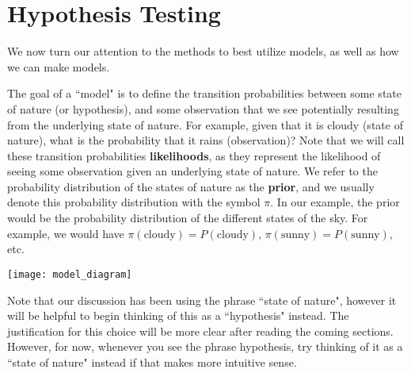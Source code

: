 \section{Hypothesis Testing}

We now turn our attention to the methods to best utilize models, as well as how we can make models. \newline 
\begin{center}
\end{center}


\begin{center}
\end{center}


\begin{center}
\end{center}

The goal of a ``model" is to define the transition probabilities between some state of nature (or hypothesis), and some observation that we see potentially resulting from the underlying state of nature. For example, given that it is cloudy (state of nature), what is the probability that it rains (observation)? Note that we will call these transition probabilities \textbf{likelihoods}, as they represent the likelihood of seeing some observation given an underlying state of nature. We refer to the probability distribution of the states of nature as the \textbf{prior}, and we usually denote this probability distribution with the symbol \(\pi\). In our example, the prior would be the probability distribution of the different states of the sky. For example, we would have \(\pi(\textrm{cloudy}) = P(\textrm{cloudy})\), \(\pi(\textrm{sunny}) = P(\textrm{sunny})\), etc. \newline 

\texttt{[image: model\_diagram]}

Note that our discussion has been using the phrase ``state of nature", however it will be helpful to begin thinking of this as a ``hypothesis" instead. The justification for this choice will be more clear after reading the coming sections. However, for now, whenever you see the phrase hypothesis, try thinking of it as a ``state of nature" instead if that makes more intuitive sense.

